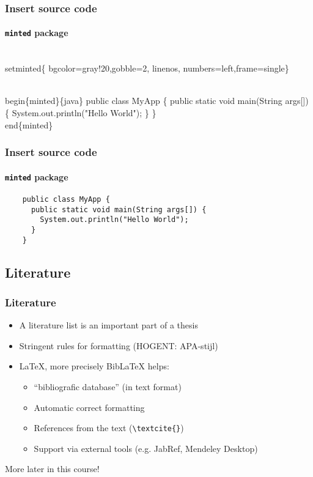 \documentclass[aspectratio=169]{beamer}
\begin{document}
\begin{frame}[fragile]
  \frametitle{Insert source code}
  \framesubtitle{\texttt{minted} package}

  \begin{semiverbatim}
  \\setminted\{%
    bgcolor=gray!20,gobble=2, linenos,
    numbers=left,frame=single\}

  \\begin\{minted\}\{java\}
    public class MyApp \{
      public static void main(String args[]) \{
        System.out.println("Hello World");
      \}
    \}
  \\end\{minted\}
  \end{semiverbatim}
\end{frame}


\begin{frame}[fragile]
  \frametitle{Insert source code}
  \framesubtitle{\texttt{minted} package}
  \begin{verbatim}
    public class MyApp {
      public static void main(String args[]) {
        System.out.println("Hello World");
      }
    }
  \end{verbatim}
\end{frame}

\subsection{Literature}

\begin{frame}[fragile]
  \frametitle{Literature}

  \begin{itemize}
    \item<+-> A literature list is an important part of a thesis
    \item<+-> Stringent rules for formatting (HOGENT: APA-stijl)
    \item<+-> {\LaTeX}, more precisely Bib{\LaTeX} helps:
    \begin{itemize}
      \item<+-> ``bibliografic database'' (in text format)
      \item<+-> Automatic correct formatting
      \item<+-> References from the text (\verb|\textcite{}|)
      \item<+-> Support via external tools (e.g. JabRef, Mendeley Desktop)
    \end{itemize}
  \end{itemize}

  \pause More later in this course!
\end{frame}
\end{document}
